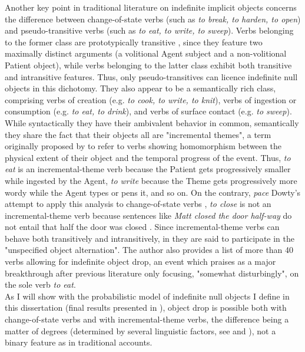 Another key point in traditional literature on indefinite implicit objects concerns the difference between change-of-state verbs (such as \textit{to break, to harden, to open}) and pseudo-transitive verbs (such as \textit{to eat, to write, to sweep}). Verbs belonging to the former class are prototypically transitive \parencite{HopperThompson1980, Kardos2010}, since they feature two maximally distinct arguments (a volitional Agent subject and a non-volitional Patient object), while verbs belonging to the latter class exhibit both transitive and intransitive features. Thus, only pseudo-transitives can licence indefinite null objects in this dichotomy. They also appear to be a semantically rich class, comprising verbs of creation (e.g. \textit{to cook, to write, to knit}), verbs of ingestion or consumption (e.g. \textit{to eat, to drink}), and verbs of surface contact (e.g. \textit{to sweep}). While syntactically they have their ambivalent behavior in common, semantically they share the fact that their objects all are "incremental themes", a term originally proposed by \textcite{dowty1991thematic} to refer to verbs showing homomorphism between the physical extent of their object and the temporal progress of the event. Thus, \textit{to eat} is an incremental-theme verb because the Patient gets progressively smaller while ingested by the Agent, \textit{to write} because the Theme gets progressively more wordy while the Agent types or pens it, and so on. On the contrary, \textit{pace} Dowty's attempt to apply this analysis to change-of-state verbs \parencite[568]{dowty1991thematic}, \textit{to close} is not an incremental-theme verb because sentences like \textit{Matt closed the door half-way} do not entail that half the door was closed \parencite[279]{RappaportHovavLevin2005}. Since incremental-theme verbs can behave both transitively and intransitively, in \textcite[33]{Levin1993} they are said to participate in the "unspecified object alternation". The author also provides a list of more than 40 verbs allowing for indefinite object drop, an event which \textcite[116]{Dvorak2017} praises as a major breakthrough after previous literature only focusing, "somewhat disturbingly", on the sole verb \textit{to eat}.\\
As I will show with the probabilistic model of indefinite null objects I define in this dissertation (final results presented in ), object drop is possible both with change-of-state verbs and with incremental-theme verbs, the difference being a matter of degrees (determined by several linguistic factors, see  and ), not a binary feature as in traditional accounts.


